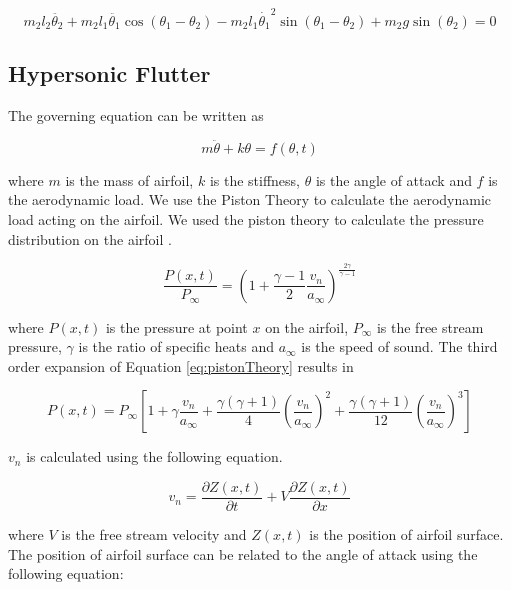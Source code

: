 \documentclass[12pt, a4paper]{extarticle}
\begin{document}
\begin{equation}
m_2  l_2 \ddot{\theta_2}+m_2 l_1 \ddot{\theta_1} \cos(\theta_1 - \theta_2)-m_2  l_1 \dot{\theta_1}^2 \sin(\theta_1 - \theta_2)+m_2 g  \sin(\theta_2) = 0
\end{equation}


\subsection{Hypersonic Flutter}
The governing equation can be written as

\begin{equation}\label{eq:GE}
	m\ddot{\theta} + k \theta = f(\theta, t)
\end{equation}

where $m$ is the mass of airfoil, $k$ is the stiffness, $\theta$ is the angle of attack and $f$ is the aerodynamic load. We use the Piston Theory to calculate the aerodynamic load acting on the airfoil. We used the piston theory to calculate the pressure distribution on the airfoil \cite{ashley2012piston}.

\begin{equation}\label{eq:pistonTheory}
	\frac{P(x, t)}{P_\infty} = \left( 1+ \frac{\gamma - 1}{2} \frac{v_n}{a_\infty} \right)^{\frac{2 \gamma}{\gamma - 1}}
\end{equation}

where $P(x, t)$ is the pressure at point $x$ on the airfoil, $P_\infty$ is the free stream pressure, $\gamma$ is the ratio of specific heats and $a_\infty$ is the speed of sound. The third order expansion of Equation \eqref{eq:pistonTheory} results in

\begin{equation}
	P(x,t) = P_\infty
	\left[
	1 +
	\gamma \frac{v_n}{a_\infty} + 
	\frac{\gamma (\gamma + 1)}{4} \left( \frac{v_n}{a_\infty} \right)^2 + 
	\frac{\gamma (\gamma + 1)}{12} \left( \frac{v_n}{a_\infty} \right)^3
	\right]
\end{equation}

$v_n$ is calculated using the following equation.

\begin{equation}\label{eq:definitionOfVn}
	v_n = \frac{\partial Z(x,t)}{\partial t} + V \frac{\partial Z(x,t)}{\partial x}
\end{equation}

where $V$ is the free stream velocity and $Z(x,t)$ is the position of airfoil surface. The position of airfoil surface can be related to the angle of attack using the following equation:
\end{document}
